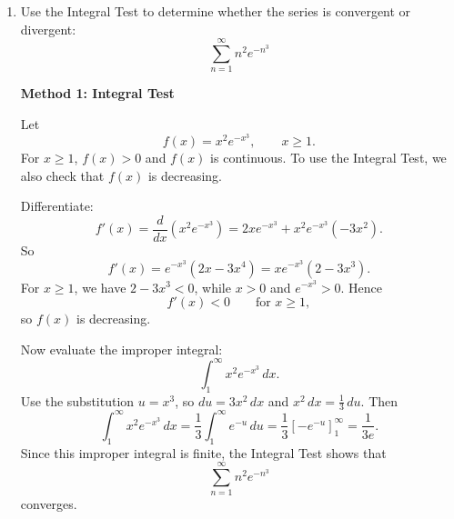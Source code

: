 \documentclass[a4paper,12pt,twocolumn]{article}
\newenvironment{solutionbox}{\begin{framed}}{\end{framed}}
\begin{document}
\begin{enumerate}[label=\textbf{\arabic*.}, leftmargin=2em, itemsep=1.2em]
\begin{solutionbox}
Let
\[
x=1+c.
\]
Then
\[
\sum_{n=2}^{\infty}(1+c)^{-n}
=
\sum_{n=2}^{\infty}x^{-n}
\]
is a geometric series with first term \(a=x^{-2}\) and common ratio \(r=x^{-1}\). Hence
\[
\frac{x^{-2}}{1-x^{-1}}=2.
\]
Simplify:
\[
\frac{1/x^2}{1-1/x}
=
\frac{1}{x(x-1)}
=2.
\]
So
\[
1=2x(x-1)
\quad\Longrightarrow\quad
2x^2-2x-1=0.
\]
Using the quadratic formula,
\[
x=\frac{2\pm\sqrt{(-2)^2-4(2)(-1)}}{4}
=
\frac{1\pm\sqrt{3}}{2}.
\]
For the infinite geometric series to converge, we need
\[
|r|<1
\quad\Longleftrightarrow\quad
\left|\frac{1}{x}\right|<1
\quad\Longleftrightarrow\quad
|x|>1.
\]
Thus the valid value is
\[
x=\frac{1+\sqrt{3}}{2}.
\]
Therefore,
\[
c=x-1=\frac{1+\sqrt{3}}{2}-1=\frac{\sqrt{3}-1}{2}.
\]
\end{solutionbox}

\begin{solutionbox}
\textbf{Method 2: Substitute \(r=(1+c)^{-1}\)}

Let
\[
r=(1+c)^{-1}.
\]
Then
\[
\sum_{n=2}^{\infty}(1+c)^{-n}
=
\sum_{n=2}^{\infty}r^n
=
\frac{r^2}{1-r}=2,
\]
with convergence condition \(|r|<1\).

So
\[
r^2=2(1-r)
\quad\Longrightarrow\quad
r^2+2r-2=0.
\]
Hence
\[
r=\frac{-2\pm\sqrt{4+8}}{2}
=
-1\pm\sqrt{3}.
\]
Since \(|r|<1\), the valid value is
\[
r=\sqrt{3}-1.
\]
Now
\[
1+c=\frac{1}{r}=\frac{1}{\sqrt{3}-1}
=
\frac{\sqrt{3}+1}{2},
\]
so
\[
c=\frac{\sqrt{3}+1}{2}-1=\frac{\sqrt{3}-1}{2}.
\]

\medskip
\textbf{Answer:}
\[
\boxed{c=\frac{\sqrt{3}-1}{2}}
\]
\end{solutionbox}

\setcounter{enumi}{7}
\item Use the Integral Test to determine whether the series is convergent or divergent:
\[
\sum_{n=1}^{\infty} n^2 e^{-n^3}
\]

\begin{solutionbox}
\textbf{Method 1: Integral Test}

Let
\[
f(x)=x^2e^{-x^3}, \qquad x\ge 1.
\]
For \(x\ge 1\), \(f(x)>0\) and \(f(x)\) is continuous. To use the Integral Test, we also check that \(f(x)\) is decreasing.

Differentiate:
\[
f'(x)=\frac{d}{dx}\left(x^2e^{-x^3}\right)
=2xe^{-x^3}+x^2e^{-x^3}(-3x^2).
\]
So
\[
f'(x)=e^{-x^3}(2x-3x^4)=xe^{-x^3}(2-3x^3).
\]
For \(x\ge 1\), we have \(2-3x^3<0\), while \(x>0\) and \(e^{-x^3}>0\). Hence
\[
f'(x)<0 \qquad \text{for } x\ge 1,
\]
so \(f(x)\) is decreasing.

Now evaluate the improper integral:
\[
\int_1^\infty x^2e^{-x^3}\,dx.
\]
Use the substitution \(u=x^3\), so \(du=3x^2\,dx\) and \(x^2\,dx=\frac13\,du\). Then
\[
\int_1^\infty x^2e^{-x^3}\,dx
=
\frac13\int_1^\infty e^{-u}\,du
=
\frac13\left[-e^{-u}\right]_1^\infty
=
\frac{1}{3e}.
\]
Since this improper integral is finite, the Integral Test shows that
\[
\sum_{n=1}^{\infty} n^2 e^{-n^3}
\]
converges.
\end{solutionbox}


\end{enumerate}
\end{document}
